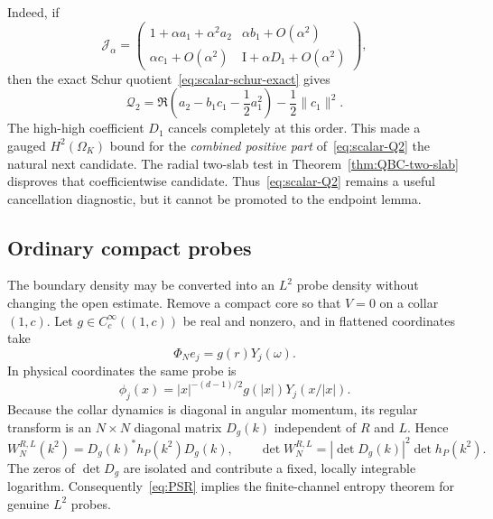 \documentclass[11pt]{article}
\newcommand{\Id}{\mathrm I}
\theoremstyle{definition}
\theoremstyle{remark}
\begin{document}
Indeed, if
\begin{equation}
 \mathcal J_\alpha=
 \begin{pmatrix}
  1+\alpha a_1+\alpha^2a_2&\alpha b_1+O(\alpha^2)\\
  \alpha c_1+O(\alpha^2)&\Id+\alpha D_1+O(\alpha^2)
 \end{pmatrix},
 \label{eq:scalar-block-expansion}
\end{equation}
then the exact Schur quotient~\eqref{eq:scalar-schur-exact} gives
\begin{equation}
 \mathcal Q_2
 =\Re\!\left(a_2-b_1c_1-\frac12a_1^2\right)
  -\frac12\|c_1\|^2.
 \label{eq:scalar-Q2-block}
\end{equation}
The high-high coefficient $D_1$ cancels completely at this order.  This made a gauged $H^2(\Omega_K)$ bound for the \emph{combined positive part} of~\eqref{eq:scalar-Q2} the natural next candidate.  The radial two-slab test in Theorem~\ref{thm:QBC-two-slab} disproves that coefficientwise candidate.  Thus~\eqref{eq:scalar-Q2} remains a useful cancellation diagnostic, but it cannot be promoted to the endpoint lemma.

\subsection{Ordinary compact probes}\label{sec:probes}

The boundary density may be converted into an $L^2$ probe density without changing the open estimate.  Remove a compact core so that $V=0$ on a collar $(1,c)$.  Let $g\in C_c^\infty((1,c))$ be real and nonzero, and in flattened coordinates take
\begin{equation}
 \Phi_Ne_j=g(r)Y_j(\omega).
 \label{eq:flattened-probe}
\end{equation}
In physical coordinates the same probe is
\begin{equation}
 \phi_j(x)=|x|^{-(d-1)/2}g(|x|)Y_j(x/|x|).
 \label{eq:physical-probe}
\end{equation}
Because the collar dynamics is diagonal in angular momentum, its regular transform is an $N\times N$ diagonal matrix $D_g(k)$ independent of $R$ and $L$.  Hence
\begin{equation}
 W_{N}^{R,L}(k^2)=D_g(k)^*h_P(k^2)D_g(k),
 \qquad
 \det W_N^{R,L}=|\det D_g(k)|^2\det h_P(k^2).
 \label{eq:probe-boundary}
\end{equation}
The zeros of $\det D_g$ are isolated and contribute a fixed, locally integrable logarithm.  Consequently~\eqref{eq:PSR} implies the finite-channel entropy theorem for genuine $L^2$ probes.
\end{document}
